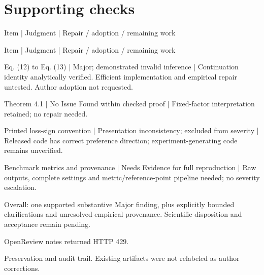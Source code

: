 \documentclass[10pt]{article}
\begin{document}
\section*{Supporting checks}
Item | Judgment | Repair / adoption / remaining work\par
Item | Judgment | Repair / adoption / remaining work\par
Eq. (12) to Eq. (13) | Major; demonstrated invalid inference | Continuation identity analytically verified. Efficient implementation and empirical repair untested. Author adoption not requested.\par
Theorem 4.1 | No Issue Found within checked proof | Fixed-factor interpretation retained; no repair needed.\par
Printed loss-sign convention | Presentation inconsistency; excluded from severity | Released code has correct preference direction; experiment-generating code remains unverified.\par
Benchmark metrics and provenance | Needs Evidence for full reproduction | Raw outputs, complete settings and metric/reference-point pipeline needed; no severity escalation.\par
Overall: one supported substantive Major finding, plus explicitly bounded clarifications and unresolved empirical provenance. Scientific disposition and acceptance remain pending.\par
OpenReview notes returned HTTP 429.\par
Preservation and audit trail. Existing artifacts were not relabeled as author corrections.\par
\end{document}
